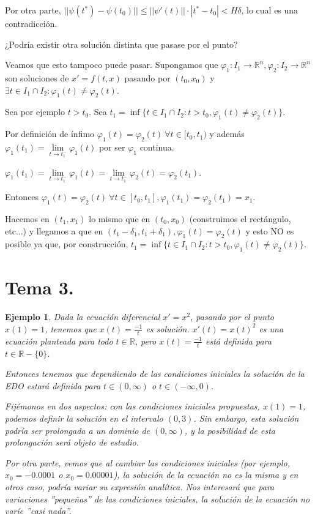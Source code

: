 \documentclass[11pt, a4paper,twoside]{article}
\makeatletter
\theoremstyle{theorem-style}  %
\renewenvironment{proof}[1][\proofname]{\par
	\pushQED{\qed}%
	\normalfont \topsep6\p@\@plus6\p@\relax
	\list{}{%
		\settowidth{\leftmargin}{\quad:\hskip\labelsep}%
		\setlength{\labelwidth}{0pt}%
		\setlength{\itemindent}{-\leftmargin}%
	}%
	\item[\hskip\labelsep\itshape#1\@addpunct{:}]\ignorespaces
}{%
	\popQED\endlist\@endpefalse
}
\theoremstyle{definition-style}
\theoremstyle{example-style}
\newtheorem{example}{Ejemplo}[section]
\let\oldsection\section
\def\section{\cleardoublepage\oldsection}
\makeatother
\begin{document}
\begin{proof}
\begin{adjustwidth}{1cm}{}
		Por otra parte, $ ||\psi(t^*)-\psi(t_0)||\leq ||\psi'(t)||\cdot |t^*-t_0|<H\delta $, lo cual es una contradicción.
	\end{adjustwidth}
	
	¿Podría existir otra solución distinta que pasase por el punto?
	\begin{adjustwidth}{1cm}{}
		Veamos que esto tampoco puede pasar. Supongamos que $ \varphi_1: I_1\longrightarrow\mathbb{R}^n, \varphi_2:I_2 \longrightarrow \mathbb{R}^n $ son soluciones de $ x'=f(t,x) $ pasando por $ (t_0,x_0) $ y $ \exists t\in I_1\cap I_2 : \varphi_1(t)\neq \varphi_2(t) $.
		
		Sea por ejemplo $ t>t_0 $. Sea $ t_1=\inf \{t \in I_1\cap I_2 :t>t_0, \varphi_1(t)\neq \varphi_2(t)  \} $.
		
		Por definición de ínfimo $ \varphi_1(t)=\varphi_2(t) \ \forall t \in [t_0, t_1) $ y además $ \varphi_1(t_1)=\lim\limits_{t\to t_1^-} \varphi_1(t) $ por ser $ \varphi_1 $ continua.
		
		$ \varphi_1(t_1)=\lim\limits_{t\to t_1^-} \varphi_1(t)=\lim\limits_{t\to t_1^-} \varphi_2(t)= \varphi_2(t_1) $.
		
		Entonces $ \varphi_1(t)=\varphi_2(t) \ \forall t \in [t_0,t_1], \varphi_1(t_1)=\varphi_2(t_1)=x_1 $.
		
		Hacemos en $ (t_1, x_1) $ lo mismo que en $ (t_0,x_0) $ (construimos el rectángulo, etc...) y llegamos a que en $ (t_1-\delta_1, t_1+\delta _1), \varphi_1(t)=\varphi_2(t) $ y esto NO es posible ya que, por construcción, $ t_1=\inf \{t\in I_1\cap I_2 : t>t_0, \varphi_1(t)\neq \varphi_2(t)\} $.
	\end{adjustwidth}
\end{proof}

\section{Tema 3.}
\begin{example}
	Dada la ecuación diferencial $ x'=x^2 $, pasando por el punto $ x(1)=1 $, tenemos que $ x(t)=\frac{-1}{t} $ es solución. $ x'(t)=x(t)^2 $ es una ecuación planteada para todo $ t \in \mathbb{R} $, pero $ x(t)=\frac{-1}{t} $ está definida para $ t \in \mathbb{R}-\{0\} $.
	
	Entonces tenemos que dependiendo de las condiciones iniciales la solución de la EDO estará definida para $ t\in (0,\infty) $ o $ t\in (-\infty,0) $.
	
	Fijémonos en dos aspectos: con las condiciones iniciales propuestas, $ x(1)=1 $, podemos definir la solución en el intervalo $ (0,3) $. Sin embargo, esta solución podría ser prolongada a un dominio de $ (0,\infty) $, y la posibilidad de esta prolongación será objeto de estudio.
	
	Por otra parte, vemos que al cambiar las condiciones iniciales (por ejemplo, $ x_0=-0.0001 $ o $ x_0=0.00001 $), la solución de la ecuación no es la misma y en otros caso, podría variar su expresión analítica. Nos interesará que para variaciones ''pequeñas'' de las condiciones iniciales, la solución de la ecuación no varíe ''casi nada''.
\end{example}
\end{document}
